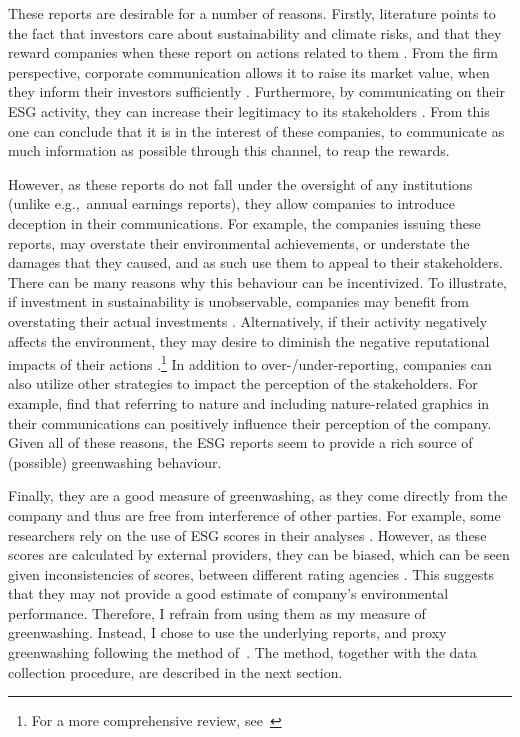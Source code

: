 \documentclass[12pt]{article}
\begin{document}
These reports are desirable for a number of reasons. Firstly, literature points to the fact that investors care about sustainability and climate risks, and that they reward companies when these report on actions related to them \parencite{ilhanClimateRiskDisclosure2023,kruegerImportanceClimateRisks2020,pastorSustainableInvestingEquilibrium2021,testaDoesItPay2018}. From the firm perspective, corporate communication allows it to raise its market value, when they inform their investors sufficiently \parencite{servaesImpactCorporateSocial2013}. Furthermore, by communicating on their ESG activity, they can increase their legitimacy to its stakeholders \parencite{torelliGreenwashingEnvironmentalCommunication2020}. From this one can conclude that it is in the interest of these companies, to communicate as much information as possible through this channel, to reap the rewards. 

However, as these reports do not fall under the oversight of any institutions (unlike e.g.,~annual earnings reports), they allow companies to introduce deception in their communications. For example, the companies issuing these reports, may overstate their environmental achievements, or understate the damages that they caused, and as such use them to appeal to their stakeholders. There can be many reasons why this behaviour can be incentivized. To illustrate, if investment in sustainability is unobservable, companies may benefit from overstating their actual investments \parencite{wuBadGreenwashingGood2020}. Alternatively, if their activity negatively affects the environment, they may desire to diminish the negative reputational impacts of their actions \parencite{marquisScrutinyNormsSelective2016, binglerCheapTalkCherrypicking2022}.\footnote{For a more comprehensive review, see~\cite{kimGreenwashVsBrownwash2015}} In addition to over-/under-reporting, companies can also utilize other strategies to impact the perception of the stakeholders. For example, \textcite{parguelCanEvokingNature2015,schmuckMisleadingConsumersGreen2018} find that referring to nature and including nature-related graphics in their communications can positively influence their perception of the company. Given all of these reasons, the ESG reports seem to provide a rich source of (possible) greenwashing behaviour.


Finally, they are a good measure of greenwashing, as they come directly from the company and thus are free from interference of other parties. For example, some researchers rely on the use of ESG scores in their analyses \parencite{servaesImpactCorporateSocial2013, flammerDoesCorporateSocial2015, linsSocialCapitalTrust2017}. However, as these scores are calculated by external providers, they can be biased, which can be seen given inconsistencies of scores, between different rating agencies \parencite{bergAggregateConfusionDivergence2022, chatterjiRatingsFirmsConverge2016}. This suggests that they may not provide a good estimate of company's environmental performance. Therefore, I refrain from using them as my measure of greenwashing. Instead, I chose to use the underlying reports, and proxy greenwashing following the method of~\textcite{binglerHowCheapTalk2024}. The method, together with the data collection procedure, are described in the next section.
\end{document}

